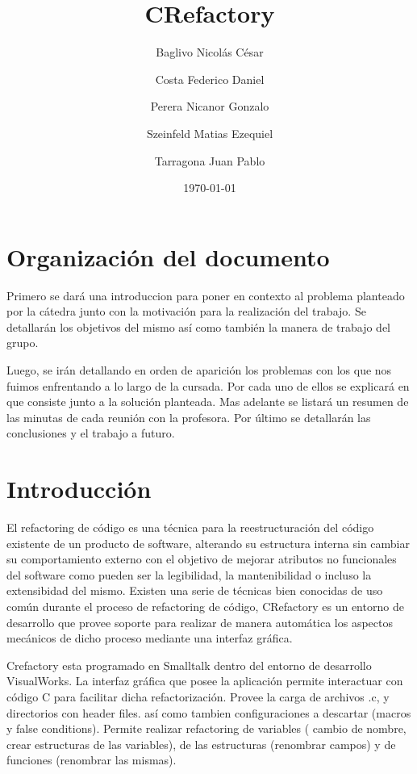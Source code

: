 \documentclass[a4paper,oneside,10pt]{article}
\begin{document}

\title{CRefactory}
\author{Baglivo Nicol\'as C\'esar \and Costa Federico Daniel \and Perera Nicanor Gonzalo \and Szeinfeld Matias Ezequiel \and Tarragona Juan Pablo}
\date{\today}
\maketitle

\tableofcontents

\newpage
\section{Organizaci\'on del documento}
Primero se dará una introduccion para poner en contexto al problema planteado por la c\'atedra junto con la  motivaci\'on para la realizaci\'on del trabajo. Se detallar\'an los objetivos del mismo así como tambi\'en la manera de trabajo del grupo.

Luego, se ir\'an detallando en orden de aparici\'on los problemas con los que nos fuimos enfrentando a lo largo de la cursada. Por cada uno de ellos se explicar\'a en que consiste junto a la soluci\'on planteada.
Mas adelante se listará un resumen de las minutas de cada reunión con la profesora.
Por \'ultimo se detallar\'an las conclusiones y el trabajo a futuro.

\section{Introducción}
El refactoring de c\'odigo es una técnica para la reestructuración del código existente de un producto de software, alterando su estructura interna sin cambiar su comportamiento externo con el objetivo de mejorar atributos no funcionales del software como pueden ser la legibilidad, la mantenibilidad o incluso la extensibidad del mismo. Existen una serie de t\'ecnicas bien conocidas de uso com\'un durante el proceso de refactoring de c\'odigo, CRefactory es un entorno de desarrollo que provee soporte para realizar de manera autom\'atica los aspectos mec\'anicos de dicho proceso mediante una interfaz gr\'afica.

Crefactory esta programado en Smalltalk dentro del entorno de desarrollo VisualWorks. La interfaz gr\'afica que posee la aplicaci\'on permite interactuar con c\'odigo C para facilitar dicha refactorizaci\'on. Provee la carga de archivos .c, y directorios con header files. as\'i como tambien configuraciones a descartar (macros y false conditions).  
Permite realizar refactoring de variables ( cambio de nombre, crear estructuras de las variables), de las estructuras (renombrar campos) y de funciones (renombrar las mismas).
\end{document}
